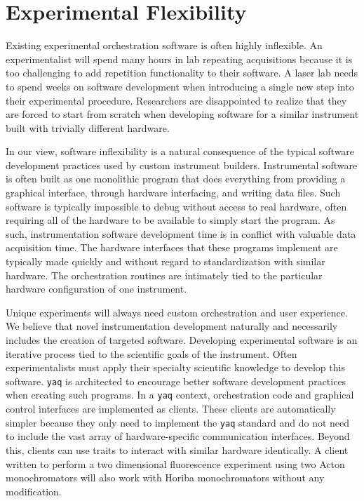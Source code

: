 \documentclass[aip, amsmath, amssymb, reprint,]{revtex4-1}
\newcommand\yaq{\texttt{yaq}}
\begin{document}
\section{Experimental Flexibility}

Existing experimental orchestration software is often highly inflexible.
An experimentalist will spend many hours in lab repeating acquisitions because it is too challenging to add repetition functionality to their software.
A laser lab needs to spend weeks on software development when introducing a single new step into their experimental procedure.
Researchers are disappointed to realize that they are forced to start from scratch when developing software for a similar instrument built with trivially different hardware.

In our view, software inflexibility is a natural consequence of the typical software development practices used by custom instrument builders.
Instrumental software is often built as one monolithic program that does everything from providing a graphical interface, through hardware interfacing, and writing data files.
Such software is typically impossible to debug without access to real hardware, often requiring all of the hardware to be available to simply start the program.
As such, instrumentation software development time is in conflict with valuable data acquisition time.
The hardware interfaces that these programs implement are typically made quickly and without regard to standardization with similar hardware.
The orchestration routines are intimately tied to the particular hardware configuration of one instrument.


Unique experiments will always need custom orchestration and user experience.
We believe that novel instrumentation development naturally and necessarily includes the creation of targeted software.
Developing experimental software is an iterative process tied to the scientific goals of the instrument.
Often experimentalists must apply their specialty scientific knowledge to develop this software.\cite{SegalJudith2005a}
\yaq{} is architected to encourage better software development practices when creating such programs.
In a \yaq{} context, orchestration code and graphical control interfaces are implemented as clients.
These clients are automatically simpler because they only need to implement the \yaq{} standard and do not need to include the vast array of hardware-specific communication interfaces.
Beyond this, clients can use traits to interact with similar hardware identically.
A client written to perform a two dimensional fluorescence experiment using two Acton monochromators will also work with Horiba monochromators without any modification.
\end{document}
